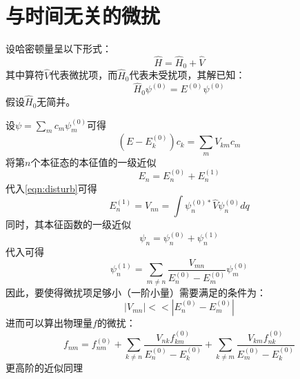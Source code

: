 \documentclass[12pt, a4paper, oneside]{ctexbook}
\newcounter{#2}
\newcounter{#2}[#1]
\numberwithin{#2}{#1}
\newcommand{\xkuo}[1]{\left(#1\right)}
\begin{document}
            \section{与时间无关的微扰}
            \begin{assmp}
              设哈密顿量呈以下形式：
              \begin{equation}
                \hat H=\hat H_0+\hat V
              \end{equation}
              其中算符\(\hat V\)代表微扰项，而\(\hat H_0\)代表未受扰项，其解已知：
              \begin{equation}
                \hat H_0\psi^{(0)}=E^{(0)}\psi^{(0)}
              \end{equation}
              假设\(\hat H_0\)无简并。
            \end{assmp}
            \begin{theorem}
              设\(\psi=\sum\limits_mc_m\psi_m^{(0)}\)可得
              \begin{equation}\label{eqn:disturb}
                \xkuo{E-E_k^{(0)}}c_k=\sum_mV_{km}c_m
              \end{equation}
              将第\(n\)个本征态的本征值的一级近似
              \begin{equation}
                E_n=E_n^{(0)}+E_n^{(1)}
              \end{equation}
              代入\autoref{eqn:disturb}可得
              \begin{equation}
                E_n^{(1)}=V_{nn}=\int\psi_n^{(0)*}\hat V\psi_n^{(0)}dq
              \end{equation}
              同时，其本征函数的一级近似
              \begin{equation}
                \psi_n=\psi_n^{(0)}+\psi_n^{(1)}
              \end{equation}
              代入可得
              \begin{equation}
                \psi_n^{(1)}=\sum_{m\neq n}\frac{V_{mn}}{E_n^{(0)}-E_m^{(0)}}\psi_m^{(0)}
              \end{equation}
              因此，要使得微扰项足够小（一阶小量）需要满足的条件为：
              \begin{equation}
                |V_{mn}|<<|E_n^{(0)}-E_m^{(0)}|
              \end{equation}
              进而可以算出物理量\(f\)的微扰：
              \begin{equation}
                f_{nm}=f_{nm}^{(0)}+\sum_{k\neq n}\frac{V_{nk}f_{km}^{(0)}}{E_n^{(0)}-E_k^{(0)}}+\sum_{k\neq m}\frac{V_{km}f_{nk}^{(0)}}{E_m^{(0)}-E_k^{(0)}}
              \end{equation}
              更高阶的近似同理
            \end{theorem}
\end{document}
